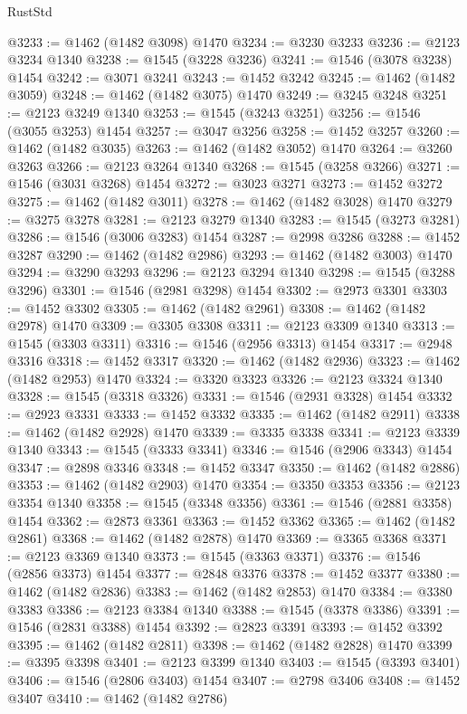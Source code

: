 \begin{lexlean}{RustStd}
\begin{coremodule}
@3233 := @1462 (@1482 @3098) @1470
@3234 := @3230 @3233
@3236 := @2123 @3234 @1340
@3238 := @1545 (@3228 @3236)
@3241 := @1546 (@3078 @3238) @1454
@3242 := @3071 @3241
@3243 := @1452 @3242
@3245 := @1462 (@1482 @3059)
@3248 := @1462 (@1482 @3075) @1470
@3249 := @3245 @3248
@3251 := @2123 @3249 @1340
@3253 := @1545 (@3243 @3251)
@3256 := @1546 (@3055 @3253) @1454
@3257 := @3047 @3256
@3258 := @1452 @3257
@3260 := @1462 (@1482 @3035)
@3263 := @1462 (@1482 @3052) @1470
@3264 := @3260 @3263
@3266 := @2123 @3264 @1340
@3268 := @1545 (@3258 @3266)
@3271 := @1546 (@3031 @3268) @1454
@3272 := @3023 @3271
@3273 := @1452 @3272
@3275 := @1462 (@1482 @3011)
@3278 := @1462 (@1482 @3028) @1470
@3279 := @3275 @3278
@3281 := @2123 @3279 @1340
@3283 := @1545 (@3273 @3281)
@3286 := @1546 (@3006 @3283) @1454
@3287 := @2998 @3286
@3288 := @1452 @3287
@3290 := @1462 (@1482 @2986)
@3293 := @1462 (@1482 @3003) @1470
@3294 := @3290 @3293
@3296 := @2123 @3294 @1340
@3298 := @1545 (@3288 @3296)
@3301 := @1546 (@2981 @3298) @1454
@3302 := @2973 @3301
@3303 := @1452 @3302
@3305 := @1462 (@1482 @2961)
@3308 := @1462 (@1482 @2978) @1470
@3309 := @3305 @3308
@3311 := @2123 @3309 @1340
@3313 := @1545 (@3303 @3311)
@3316 := @1546 (@2956 @3313) @1454
@3317 := @2948 @3316
@3318 := @1452 @3317
@3320 := @1462 (@1482 @2936)
@3323 := @1462 (@1482 @2953) @1470
@3324 := @3320 @3323
@3326 := @2123 @3324 @1340
@3328 := @1545 (@3318 @3326)
@3331 := @1546 (@2931 @3328) @1454
@3332 := @2923 @3331
@3333 := @1452 @3332
@3335 := @1462 (@1482 @2911)
@3338 := @1462 (@1482 @2928) @1470
@3339 := @3335 @3338
@3341 := @2123 @3339 @1340
@3343 := @1545 (@3333 @3341)
@3346 := @1546 (@2906 @3343) @1454
@3347 := @2898 @3346
@3348 := @1452 @3347
@3350 := @1462 (@1482 @2886)
@3353 := @1462 (@1482 @2903) @1470
@3354 := @3350 @3353
@3356 := @2123 @3354 @1340
@3358 := @1545 (@3348 @3356)
@3361 := @1546 (@2881 @3358) @1454
@3362 := @2873 @3361
@3363 := @1452 @3362
@3365 := @1462 (@1482 @2861)
@3368 := @1462 (@1482 @2878) @1470
@3369 := @3365 @3368
@3371 := @2123 @3369 @1340
@3373 := @1545 (@3363 @3371)
@3376 := @1546 (@2856 @3373) @1454
@3377 := @2848 @3376
@3378 := @1452 @3377
@3380 := @1462 (@1482 @2836)
@3383 := @1462 (@1482 @2853) @1470
@3384 := @3380 @3383
@3386 := @2123 @3384 @1340
@3388 := @1545 (@3378 @3386)
@3391 := @1546 (@2831 @3388) @1454
@3392 := @2823 @3391
@3393 := @1452 @3392
@3395 := @1462 (@1482 @2811)
@3398 := @1462 (@1482 @2828) @1470
@3399 := @3395 @3398
@3401 := @2123 @3399 @1340
@3403 := @1545 (@3393 @3401)
@3406 := @1546 (@2806 @3403) @1454
@3407 := @2798 @3406
@3408 := @1452 @3407
@3410 := @1462 (@1482 @2786)

\end{coremodule}
\end{lexlean}
